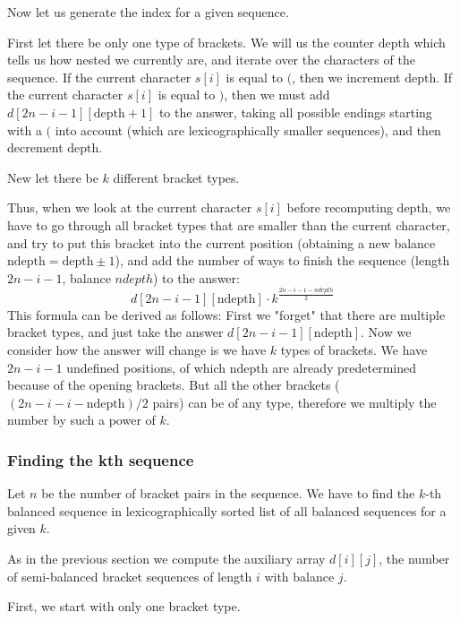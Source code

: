 \documentclass[8pt, a4paper, oneside, twocolumn]{extarticle}
\begin{document}
Now let us generate the index for a given sequence.

First let there be only one type of brackets. We will us the counter $\text{depth}$ which tells us how nested we currently are, and iterate over the characters of the sequence. If the current character $s[i]$ is equal to $($, then we increment $\text{depth}$. If the current character $s[i]$ is equal to $)$, then we must add $d[2n-i-1][\text{depth}+1]$ to the answer, taking all possible endings starting with a $($ into account (which are lexicographically smaller sequences), and then decrement $\text{depth}$.

New let there be $k$ different bracket types.

Thus, when we look at the current character $s[i]$ before recomputing $\text{depth}$, we have to go through all bracket types that are smaller than the current character, and try to put this bracket into the current position (obtaining a new balance $\text{ndepth} = \text{depth} \pm 1$), and add the number of ways to finish the sequence (length $2n-i-1$, balance $ndepth$) to the answer: $$d[2n - i - 1][\text{ndepth}] \cdot k^{\frac{2n - i - 1 - ndepth}{2}}$$ This formula can be derived as follows: First we "forget" that there are multiple bracket types, and just take the answer $d[2n - i - 1][\text{ndepth}]$. Now we consider how the answer will change is we have $k$ types of brackets. We have $2n - i - 1$ undefined positions, of which $\text{ndepth}$ are already predetermined because of the opening brackets. But all the other brackets ($(2n - i - i - \text{ndepth})/2$ pairs) can be of any type, therefore we multiply the number by such a power of $k$.
\subsubsection{Finding the kth sequence}
Let $n$ be the number of bracket pairs in the sequence. We have to find the $k$-th balanced sequence in lexicographically sorted list of all balanced sequences for a given $k$.

As in the previous section we compute the auxiliary array $d[i][j]$, the number of semi-balanced bracket sequences of length $i$ with balance $j$.

First, we start with only one bracket type.
\end{document}
